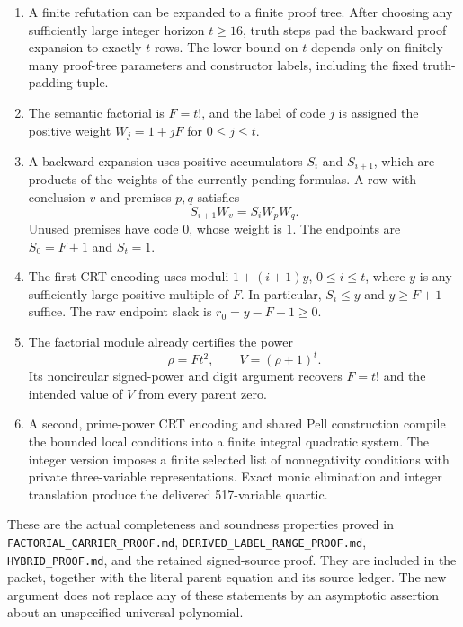 \documentclass[11pt]{article}
\newcommand{\file}[1]{\nolinkurl{#1}}
\theoremstyle{definition}\newtheorem{definition}[theorem]{Definition}
\theoremstyle{remark}\newtheorem{remark}[theorem]{Remark}
\begin{document}
\begin{enumerate}
\item A finite refutation can be expanded to a finite proof tree. After
choosing any sufficiently large integer horizon $t\ge16$, truth steps pad
the backward proof expansion to exactly $t$ rows. The lower bound on $t$
depends only on finitely many proof-tree parameters and constructor labels,
including the fixed truth-padding tuple.
\item The semantic factorial is $F=t!$, and the label of code $j$ is assigned
the positive weight $W_j=1+jF$ for $0\le j\le t$.
\item A backward expansion uses positive accumulators $S_i$ and $S_{i+1}$,
which are products of the weights of the currently pending formulas. A row
with conclusion $v$ and premises $p,q$ satisfies
\[
 S_{i+1}W_v=S_iW_pW_q.
 \tag{3}\label{eq:flow}
\]
Unused premises have code $0$, whose weight is $1$. The endpoints are
$S_0=F+1$ and $S_t=1$.
\item The first CRT encoding uses moduli $1+(i+1)y$, $0\le i\le t$,
where $y$ is any sufficiently large positive multiple of $F$. In particular,
$S_i\le y$ and $y\ge F+1$ suffice. The raw endpoint slack is
$r_0=y-F-1\ge0$.
\item The factorial module already certifies the power
\[
 \rho=Ft^2,\qquad V=(\rho+1)^t.
 \tag{4}\label{eq:oldpower}
\]
Its noncircular signed-power and digit argument recovers $F=t!$ and the
intended value of $V$ from every parent zero.
\item A second, prime-power CRT encoding and shared Pell construction
compile the bounded local conditions into a finite integral quadratic
system. The integer version imposes a finite selected list of nonnegativity
conditions with private three-variable representations. Exact monic
elimination and integer translation produce the delivered 517-variable
quartic.
\end{enumerate}

These are the actual completeness and soundness properties proved in
\file{FACTORIAL_CARRIER_PROOF.md},
\file{DERIVED_LABEL_RANGE_PROOF.md},
\file{HYBRID_PROOF.md}, and the retained signed-source proof. They are
included in the packet, together with the literal parent equation and its
source ledger. The new argument does not replace any of these statements by
an asymptotic assertion about an unspecified universal polynomial.
\end{document}

